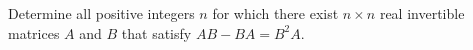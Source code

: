Determine all positive integers $n$ for which there exist $n\times n$ real invertible matrices $A$ and $B$ that satisfy $AB-BA=B^2A$.

